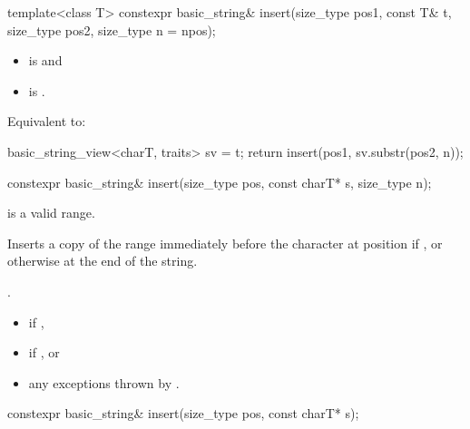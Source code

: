 %
\begin{itemdecl}
template<class T>
  constexpr basic_string& insert(size_type pos1, const T& t,
                                 size_type pos2, size_type n = npos);
\end{itemdecl}

\begin{itemdescr}
\pnum
\constraints
\begin{itemize}
\item
{} is
 and
\item
{} is
.
\end{itemize}

\pnum
\effects
Equivalent to:
\begin{codeblock}
basic_string_view<charT, traits> sv = t;
return insert(pos1, sv.substr(pos2, n));
\end{codeblock}
\end{itemdescr}

%
\begin{itemdecl}
constexpr basic_string& insert(size_type pos, const charT* s, size_type n);
\end{itemdecl}

\begin{itemdescr}
\pnum
\expects
{} is a valid range.

\pnum
\effects
Inserts a copy of the range 
immediately before the character at position  if ,
or otherwise at the end of the string.

\pnum
\returns
{}.

\pnum
\throws
\begin{itemize}
\item {} if ,
\item {} if , or
\item any exceptions thrown by .
\end{itemize}
\end{itemdescr}

%
\begin{itemdecl}
constexpr basic_string& insert(size_type pos, const charT* s);
\end{itemdecl}

